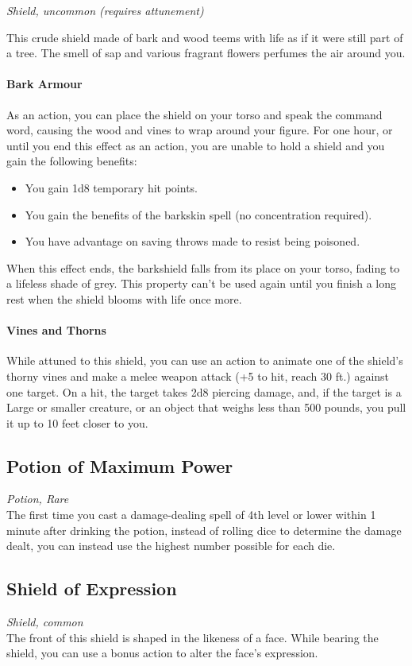 \indent\textit{Shield, uncommon (requires attunement)}\\
{\entryfont This crude shield made of bark and wood teems with life as if it were still part of a tree. The smell of sap and various fragrant flowers perfumes the air around you.

\paragraph*{Bark Armour} As an action, you can place the shield on your torso and speak the command word, causing the wood and vines to wrap around your figure. For one hour, or until you end this effect as an action, you are unable to hold a shield and you gain the following benefits:
\begin{itemize}
	\item You gain 1d8 temporary hit points.
	\item You gain the benefits of the barkskin spell (no concentration required).
	\item You have advantage on saving throws made to resist being poisoned.
\end{itemize}

When this effect ends, the barkshield falls from its place on your torso, fading to a lifeless shade of grey. This property can't be used again until you finish a long rest when the shield blooms with life once more.

\paragraph*{Vines and Thorns} While attuned to this shield, you can use an action to animate one of the shield's thorny vines and make a melee weapon attack (+5 to hit, reach 30 ft.) against one target. On a hit, the target takes 2d8 piercing damage, and, if the target is a Large or smaller creature, or an object that weighs less than 500 pounds, you pull it up to 10 feet closer to you.}

\subsection*{Potion of Maximum Power}\label{mi:PotionMaximumPower}
\textit{Potion, Rare}\\
{\entryfont The first time you cast a damage-dealing spell of 4th level or lower within 1 minute after drinking the potion, instead of rolling dice to determine the damage dealt, you can instead use the highest number possible for each die.}

\subsection*{Shield of Expression}\label{mi:ShieldOfExpression}
\textit{Shield, common}\\
{\entryfont The front of this shield is shaped in the likeness of a face. While bearing the shield, you can use a bonus action to alter the face's expression.}